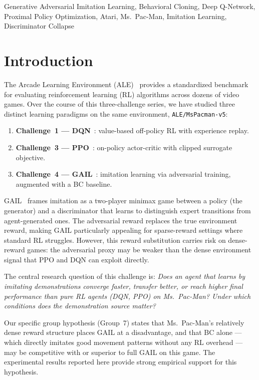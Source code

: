 \documentclass[conference]{IEEEtran}
\begin{document}
\begin{IEEEkeywords}
Generative Adversarial Imitation Learning, Behavioral Cloning, Deep Q-Network,
Proximal Policy Optimization, Atari, Ms.\ Pac-Man, Imitation Learning,
Discriminator Collapse
\end{IEEEkeywords}

\section{Introduction}
\label{sec:intro}

The Arcade Learning Environment (ALE)~\cite{bellemare2013ale} provides a standardized
benchmark for evaluating reinforcement learning (RL) algorithms across dozens of video
games.
Over the course of this three-challenge series, we have studied three distinct learning
paradigms on the same environment, \texttt{ALE/MsPacman-v5}:

\begin{enumerate}
  \item \textbf{Challenge~1 — DQN}~\cite{mnih2015dqn}: value-based off-policy RL with
        experience replay.
  \item \textbf{Challenge~3 — PPO}~\cite{schulman2017ppo}: on-policy actor-critic with
        clipped surrogate objective.
  \item \textbf{Challenge~4 — GAIL}~\cite{ho2016gail}: imitation learning via adversarial
        training, augmented with a BC baseline.
\end{enumerate}

GAIL~\cite{ho2016gail} frames imitation as a two-player minimax game between a policy
(the generator) and a discriminator that learns to distinguish expert transitions from
agent-generated ones.
The adversarial reward replaces the true environment reward, making GAIL particularly
appealing for sparse-reward settings where standard RL struggles.
However, this reward substitution carries risk on dense-reward games: the adversarial proxy
may be weaker than the dense environment signal that PPO and DQN can exploit directly.

The central research question of this challenge is:
\textit{Does an agent that learns by imitating demonstrations converge faster, transfer
better, or reach higher final performance than pure RL agents (DQN, PPO) on Ms.\ Pac-Man?
Under which conditions does the demonstration source matter?}

Our specific group hypothesis (Group~7) states that Ms.\ Pac-Man's relatively dense reward
structure places GAIL at a disadvantage, and that BC alone --- which directly imitates
good movement patterns without any RL overhead --- may be competitive with or superior to
full GAIL on this game.
The experimental results reported here provide strong empirical support for this hypothesis.
\end{document}
